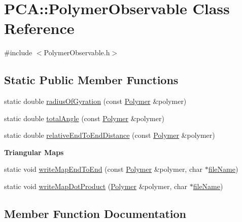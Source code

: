\hypertarget{class_p_c_a_1_1_polymer_observable}{}\section{P\+CA\+:\+:Polymer\+Observable Class Reference}
\label{class_p_c_a_1_1_polymer_observable}


{\ttfamily \#include $<$Polymer\+Observable.\+h$>$}

\subsection*{Static Public Member Functions}
\begin{DoxyCompactItemize}
\item 
static double \hyperlink{class_p_c_a_1_1_polymer_observable_a4c86e883bb2cede01b67263f00ab427c}{radius\+Of\+Gyration} (const \hyperlink{class_p_c_a_1_1_polymer}{Polymer} \&polymer)
\item 
static double \hyperlink{class_p_c_a_1_1_polymer_observable_ae5b2dbf1d87aa54347f2a66bfb24e78b}{total\+Angle} (const \hyperlink{class_p_c_a_1_1_polymer}{Polymer} \&polymer)
\item 
static double \hyperlink{class_p_c_a_1_1_polymer_observable_a72ff49d3aed6660b0bd7a8175f3b436e}{relative\+End\+To\+End\+Distance} (const \hyperlink{class_p_c_a_1_1_polymer}{Polymer} \&polymer)
\end{DoxyCompactItemize}
\begin{Indent}{\bf Triangular Maps}\par
\begin{DoxyCompactItemize}
\item 
static void \hyperlink{class_p_c_a_1_1_polymer_observable_ac63e1b37da93eca84e21916f01279a59}{write\+Map\+End\+To\+End} (const \hyperlink{class_p_c_a_1_1_polymer}{Polymer} \&polymer, char $\ast$\hyperlink{map_end_to_end_movie_8m_acbece2625a541230e9f9091adca38c8c}{file\+Name})
\item 
static void \hyperlink{class_p_c_a_1_1_polymer_observable_aa41850ca819c76bdceeb644e0a570c46}{write\+Map\+Dot\+Product} (\hyperlink{class_p_c_a_1_1_polymer}{Polymer} \&polymer, char $\ast$\hyperlink{map_end_to_end_movie_8m_acbece2625a541230e9f9091adca38c8c}{file\+Name})
\end{DoxyCompactItemize}
\end{Indent}


\subsection{Member Function Documentation}
\hypertarget{class_p_c_a_1_1_polymer_observable_a4c86e883bb2cede01b67263f00ab427c}{}\label{class_p_c_a_1_1_polymer_observable_a4c86e883bb2cede01b67263f00ab427c} 
